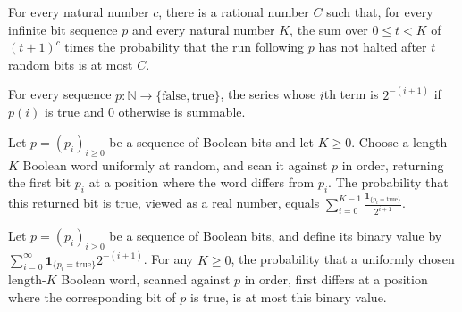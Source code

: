 \begin{theorem}
\label{Randomized.exists_expCost_rhoCoinRun_le}
\leanok
{}
For every natural number $c$, there is a rational number $C$ such that, for every
infinite bit sequence $p$ and every natural number $K$, the sum over $0\le t<K$ of
$(t+1)^c$ times the probability that the run following $p$ has not halted after $t$
random bits is at most $C$.
\end{theorem}

\begin{theorem}
\label{Randomized.summable_binVal}
\leanok
{}
For every sequence $p:\mathbb{N}\to\{\mathrm{false},\mathrm{true}\}$, the series whose
$i$th term is $2^{-(i+1)}$ if $p(i)$ is true and $0$ otherwise is summable.
\end{theorem}

\begin{theorem}
\label{Randomized.randProb_rhoCoinRun_eq_sum_real}
\leanok
{}
Let $p=(p_i)_{i\ge 0}$ be a sequence of Boolean bits and let $K\ge 0$. Choose a
length-$K$ Boolean word uniformly at random, and scan it against $p$ in order, returning
the first bit $p_i$ at a position where the word differs from $p_i$. The probability
that this returned bit is true, viewed as a real number, equals
$\displaystyle\sum_{i=0}^{K-1}\frac{\mathbf 1_{\{p_i=\mathrm{true}\}}}{2^{i+1}}$.
\end{theorem}

\begin{theorem}
\label{Randomized.randProb_rhoCoinRun_le_binVal}
\leanok
{}
Let $p=(p_i)_{i\ge 0}$ be a sequence of Boolean bits, and define its binary value by
$\displaystyle\sum_{i=0}^{\infty}\mathbf 1_{\{p_i=\mathrm{true}\}}2^{-(i+1)}$. For any
$K\ge 0$, the probability that a uniformly chosen length-$K$ Boolean word, scanned
against $p$ in order, first differs at a position where the corresponding bit of $p$ is
true, is at most this binary value.
\end{theorem}

